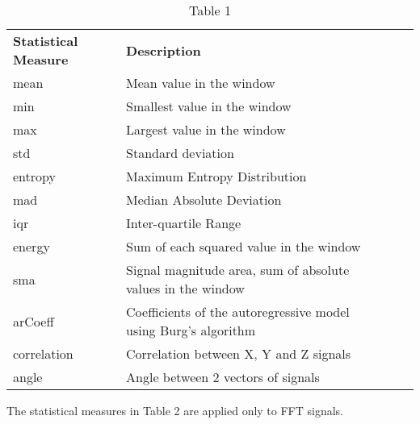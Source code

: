     \begin{table}[ht]
        \begin{tabular}{|l|l|lll}
            \cline{1-2}
            \textbf{Statistical Measure} & \textbf{Description} &  &  &  \\ \cline{1-2}
            mean             & Mean value in the window           &  &  &  \\ \cline{1-2}
            min            & Smallest value in the window           &  &  &  \\ \cline{1-2}
            max            & Largest value in the window           &  &  & \\ \cline{1-2}
            std            & Standard deviation           &  &  & \\ \cline{1-2}
            entropy            & Maximum Entropy Distribution           &  &  & \\ \cline{1-2}
            mad            & Median Absolute Deviation           &  &  & \\ \cline{1-2}
            iqr            & Inter-quartile Range           &  &  & \\ \cline{1-2}
            energy            & Sum of each squared value in the window           &  &  & \\ \cline{1-2}
            sma            & Signal magnitude area, sum of absolute values in the window           &  &  & \\ \cline{1-2}
            arCoeff            & Coefficients of the autoregressive model using Burg's algorithm           &  &  & \\ \cline{1-2}
            correlation            & Correlation between X, Y and Z signals           &  &  & \\ \cline{1-2}
            angle            & Angle between 2 vectors of signals           &  &  & \\ \cline{1-2}
        \end{tabular}
        \caption*{Table 1}
    \end{table}

    The statistical measures in Table 2 are applied only to FFT signals.

